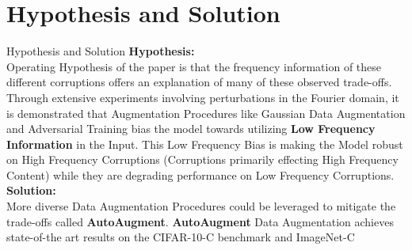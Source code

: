 \documentclass[8pt]{beamer}
\begin{document}
\section{Hypothesis and Solution}
\begin{frame}{Hypothesis and Solution}
\textbf{Hypothesis:}\\
\qquad Operating Hypothesis of the paper is that the frequency information of these different corruptions offers an explanation of many of these observed trade-offs. Through extensive experiments involving perturbations in the Fourier domain, it is demonstrated that Augmentation Procedures like Gaussian Data Augmentation and Adversarial Training bias the model towards utilizing \textbf{Low Frequency Information} in the Input. This Low Frequency Bias is making the Model robust on High Frequency Corruptions (Corruptions primarily effecting High Frequency Content) while they are degrading performance on Low Frequency Corruptions.\\
\vspace{0.2in}
\textbf{Solution:}\\
\qquad More diverse Data Augmentation Procedures could be leveraged to mitigate the trade-offs called \textbf{AutoAugment}. \textbf{AutoAugment} Data Augmentation achieves state-of-the art results on the CIFAR-10-C benchmark and ImageNet-C
\end{frame}
\end{document}
